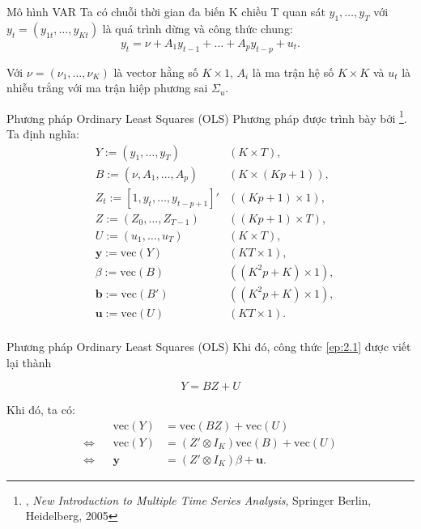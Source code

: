 \begin{frame}{Mô hình VAR}
    Ta có chuỗi thời gian đa biến K chiều T quan sát $y_1,\dots,y_T$ với $y_t = (y_{1t}, \dots, y_{Kt})$ là quá trình dừng và công thức chung:
\begin{equation}
    y_t = \nu + A_1 y_{t-1} + \dots + A_p y_{t-p} + u_t. \label{ep:2.1}
\end{equation}

Với $\nu = (\nu_1, \dots, \nu_K)$ là vector hằng số $K \times 1$, $A_i$ là ma trận hệ số $K \times K$ và $u_t$ là nhiễu trắng với ma trận hiệp phương sai $\Sigma_u$.
\end{frame}

\begin{frame}{Phương pháp Ordinary Least Squares (OLS)}
    Phương pháp được trình bày bởi  \footnote{, \textit{New Introduction to Multiple Time Series Analysis}, Springer Berlin, Heidelberg, 2005}. Ta định nghĩa:
    \begin{align*}
    & Y := (y_1, \dots, y_T) & (K \times T), \\    
    & B := (\nu, A_1, \dots, A_p) & (K \times (Kp + 1)), \\   
    & Z_t := [1, y_t, \dots, y_{t-p+1}]' &  ((Kp + 1) \times 1), \\
    & Z := (Z_0, \dots, Z_{T-1}) & ((Kp + 1) \times T), \\
    & U := (u_1,\dots, u_T) & (K \times T), \\
    & \textbf{y} := \text{vec}(Y) & (KT \times 1), \\
    & \beta := \text{vec}(B) & ((K^2p+K) \times 1), \\
    & \textbf{b} := \text{vec}(B') & ((K^2p+K) \times 1), \\
    & \textbf{u} := \text{vec}(U) & (KT \times 1). \\
\end{align*}
    
\end{frame}

\begin{frame}{Phương pháp Ordinary Least Squares (OLS)}
    Khi đó, công thức \ref{ep:2.1} được viết lại thành

\begin{equation}
    Y = BZ + U
\end{equation}

Khi đó, ta có: 
\begin{align}
        && \text{vec}(Y) &= \text{vec}(BZ) +\text{vec}(U) \nonumber \\  
       \Leftrightarrow && \text{vec}(Y) & = (Z' \otimes I_K) \text{vec}(B) + \text{vec}(U) \nonumber \\ 
        \Leftrightarrow && \textbf{y}  &= (Z' \otimes I_K) \beta + \textbf{u}. \label{eq:2.3}
\end{align}

\end{frame}

